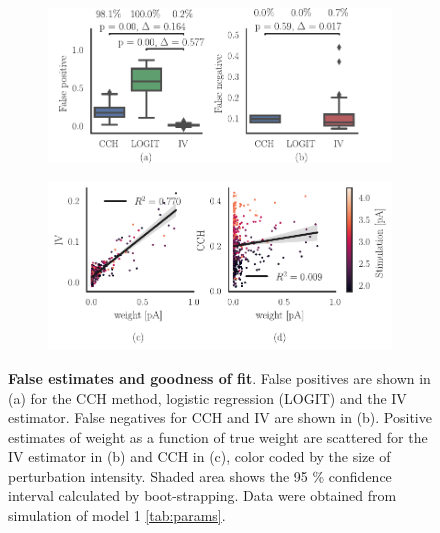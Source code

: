 \documentclass[11pt]{article}
\begin{document}
\begin{figure}
\makeatletter
\renewcommand\p@subfigure{}
\makeatother
\begin{subfigure}{\textwidth} 
\includegraphics[scale=1]{false_estimate}
\end{subfigure}

\medskip
\begin{subfigure}{\textwidth} 
\includegraphics[scale=.95]{goodness_fit}
\end{subfigure}
\caption{{\bf False estimates and goodness of fit}. 
False positives are shown in (a) for the CCH method, logistic regression (LOGIT) and the IV estimator. 
False negatives for CCH and IV are shown in (b). 
Positive estimates of weight as a function of true weight are scattered for the IV estimator in (b) and CCH in (c), color coded by the size of perturbation intensity. 
Shaded area shows the 95 \% confidence interval calculated by boot-strapping. 
Data were obtained from simulation of model 1 \cref{tab:params}.
\label{fig:fitness}}
\end{figure}
\FloatBarrier
\end{document}
